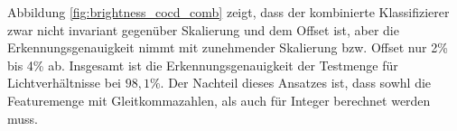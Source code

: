 \newline
\newline
Abbildung \ref{fig:brightness_cocd_comb} zeigt, dass der kombinierte Klassifizierer zwar nicht invariant gegenüber Skalierung und dem Offset ist, aber die Erkennungsgenauigkeit nimmt mit zunehmender
Skalierung bzw. Offset nur 2\% bis 4\% ab. Insgesamt ist die Erkennungsgenauigkeit der Testmenge für Lichtverhältnisse bei $98,1\%$.
\newline
\newline
Der Nachteil dieses Ansatzes ist, dass sowhl die Featuremenge mit Gleitkommazahlen, als auch für Integer berechnet werden muss.
